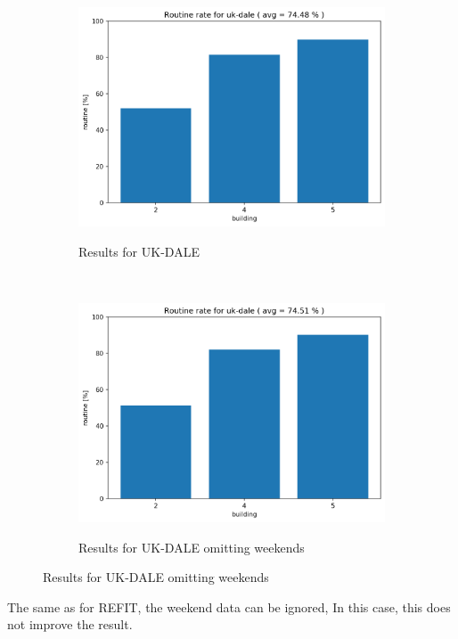 \begin{figure}[H]
	\begin{subfigure}{.5\textwidth}
        \caption{Results for UK-DALE}
        \includegraphics[width=1\textwidth]{Figures/EC/ukdale_res.png}
        \label{fig:ukdale_res}
    \end{subfigure}
    ~
    \begin{subfigure}{.5\textwidth}
        \centering
        \caption{Results for UK-DALE omitting weekends}
        \includegraphics[width=1\textwidth]{Figures/EC/ukdale_nw_res.png}
        \label{fig:ukdale_res_nw}
    \end{subfigure}
\end{figure}


The same as for REFIT, the weekend data can be ignored,
In this case, this does not improve the result. 
